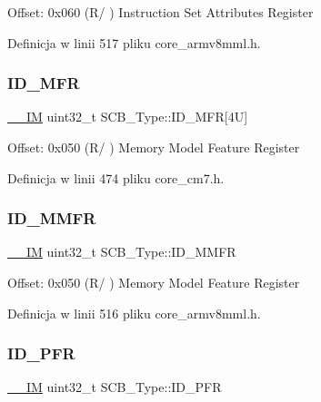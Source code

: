 Offset\+: 0x060 (R/ ) Instruction Set Attributes Register 

Definicja w linii 517 pliku core\+\_\+armv8mml.\+h.

\mbox{\label{struct_s_c_b___type_a781ef24d88610a432e7d5b179d78de47}} 
\subsubsection{\texorpdfstring{I\+D\+\_\+\+M\+FR}{ID\_MFR}}
{\footnotesize\ttfamily \hyperlink{core__sc300_8h_a4cc1649793116d7c2d8afce7a4ffce43}{\+\_\+\+\_\+\+IM} uint32\+\_\+t S\+C\+B\+\_\+\+Type\+::\+I\+D\+\_\+\+M\+FR\mbox{[}4\+U\mbox{]}}

Offset\+: 0x050 (R/ ) Memory Model Feature Register 

Definicja w linii 474 pliku core\+\_\+cm7.\+h.

\mbox{\label{struct_s_c_b___type_ad3ce108b65d07e91c4a1054d50e4bd8a}} 
\subsubsection{\texorpdfstring{I\+D\+\_\+\+M\+M\+FR}{ID\_MMFR}}
{\footnotesize\ttfamily \hyperlink{core__sc300_8h_a4cc1649793116d7c2d8afce7a4ffce43}{\+\_\+\+\_\+\+IM} uint32\+\_\+t S\+C\+B\+\_\+\+Type\+::\+I\+D\+\_\+\+M\+M\+FR}

Offset\+: 0x050 (R/ ) Memory Model Feature Register 

Definicja w linii 516 pliku core\+\_\+armv8mml.\+h.

\mbox{\label{struct_s_c_b___type_a7a23d21186bc6aa71855a68666202984}} 
\subsubsection{\texorpdfstring{I\+D\+\_\+\+P\+FR}{ID\_PFR}}
{\footnotesize\ttfamily \hyperlink{core__sc300_8h_a4cc1649793116d7c2d8afce7a4ffce43}{\+\_\+\+\_\+\+IM} uint32\+\_\+t S\+C\+B\+\_\+\+Type\+::\+I\+D\+\_\+\+P\+FR}

